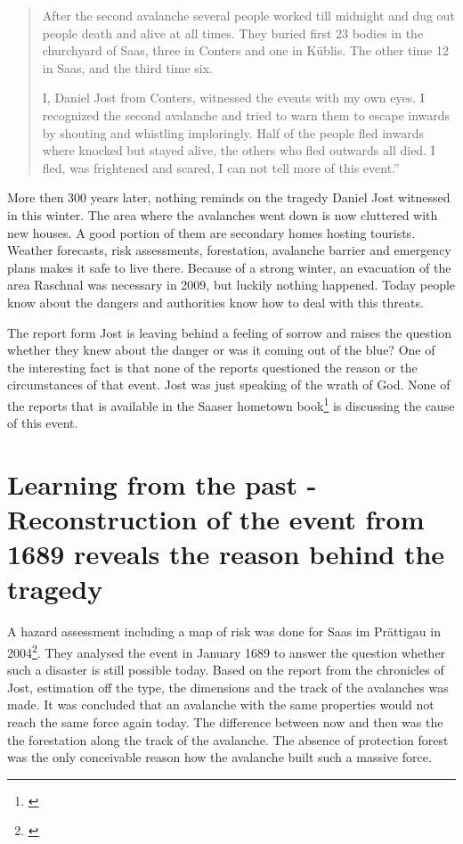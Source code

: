 \documentclass[12pt, a4paper]{article}
\begin{document}
\begin{quote}
After the second avalanche several people worked till midnight and dug out people death and alive at all times. 
They buried first 23 bodies in the churchyard of Saas, three in Conters and one in Küblis. The other time 12 in Saas, 
and the third time six. 

I, Daniel Jost from Conters, witnessed the events with my own eyes. I recognized the second avalanche and tried to warn 
them to escape inwards by shouting and whistling imploringly. Half of the people fled inwards where knocked but stayed 
alive, the others who fled outwards all died. I fled, was frightened and scared, I can not tell more of this event.''
\end{quote}

\setlength{\parskip}{1.5em}

More then 300 years later, nothing reminds on the tragedy Daniel Jost witnessed in this winter. The area where the avalanches 
went down is now cluttered with new houses. A good portion of them are secondary homes hosting tourists. Weather forecasts, 
risk assessments, forestation, avalanche barrier and emergency plans makes it safe to live there. Because of a strong winter, 
an evacuation of the area Raschnal was necessary in 2009, but luckily nothing happened. Today people know about the dangers 
and authorities know how to deal with this threats. 

The report form Jost is leaving behind a feeling of sorrow and raises the question whether they knew about the danger or 
was it coming out of the blue? One of the interesting fact is that none of the reports questioned the reason or the 
circumstances of that event. Jost was just speaking of the wrath of God. None of the reports that is available in the Saaser 
hometown book\footnote{\citet[p.~50-54]{hansemann1995saaser}} is discussing the cause of this event. 

\section*{Learning from the past -  Reconstruction of the event from 1689 reveals the reason behind the tragedy}
A hazard assessment including a map of risk was done for Saas im Prättigau in 2004\footnote{\cite{teufen2004}}. 
They analysed  the event in January 1689 to answer the question whether such a disaster is still possible today.  
Based on the report from the chronicles of Jost, estimation off the type, the dimensions and the track of the avalanches was 
made. It was concluded that an avalanche with the same properties would not reach the same force again today. 
The difference between now and then was the the forestation along the track of the avalanche. The absence of protection 
forest was the only conceivable reason how the avalanche built such a massive force. 
\end{document}
